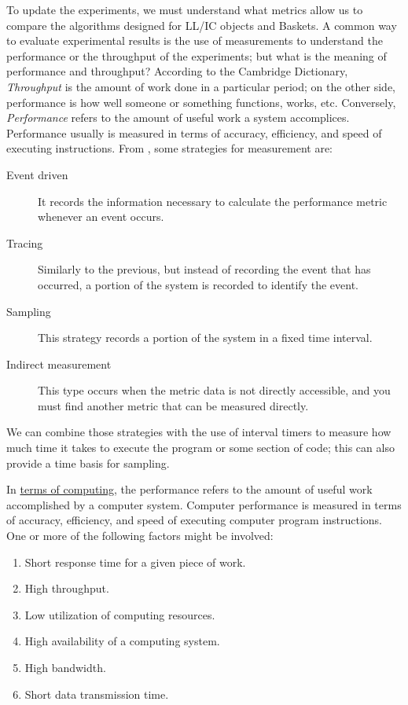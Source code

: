 To update the experiments, we must understand what metrics
allow us to compare the algorithms designed for LL/IC objects and Baskets. A
common way to evaluate experimental results is the use of measurements to
understand the performance or the throughput of the experiments;
but what is the meaning of performance and throughput? According to the
Cambridge Dictionary, \emph{Throughput} is the amount of work done in a particular
period; on the other side, performance is how well someone or something
functions, works, etc. Conversely, \emph{Performance} refers to the amount
of useful work a system accomplices. Performance usually is measured in
terms of accuracy, efficiency, and speed of executing instructions. From
\cite{lilja2005measuring}, some strategies for measurement are:

\begin{description}
\item[{Event driven}] It records the information necessary to calculate the
performance metric whenever an event occurs.
\item[{Tracing}] Similarly to the previous, but instead of recording the event
that has occurred, a portion of the system is recorded to identify the event.
\item[{Sampling}] This strategy records a portion of the system in a fixed time
interval.
\item[{Indirect measurement}] This type occurs when the metric data is not
directly accessible, and you must find another metric that can be measured
directly.
\end{description}

We can combine those strategies with the use of interval timers to measure
how much time it takes to execute the program or some section of code; this can
also provide a time basis for sampling.

In \href{https://en.wikipedia.org/wiki/Computer\_performance}{terms of computing}, the performance refers to the amount of useful
work accomplished by a computer system. Computer performance is measured in
terms of accuracy, efficiency, and speed of executing computer program
instructions. One or more of the following factors might be involved:

\begin{enumerate}
\item Short response time for a given piece of work.
\item High throughput.
\item Low utilization of computing resources.
\item High availability of a computing system.
\item High bandwidth.
\item Short data transmission time.
\end{enumerate}

